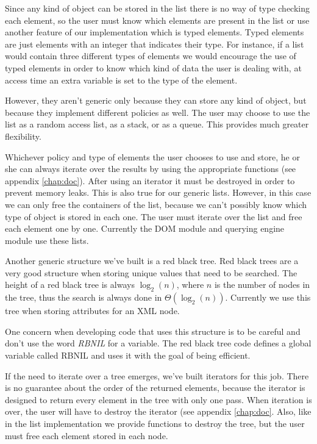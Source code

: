 \documentclass[a4paper]{report}
\begin{document}
		Since any kind of object can be stored in the list there is no way of type checking each element, so the user must know which elements are present in the list or use another feature of our implementation which is typed elements. Typed elements are just elements with an integer that indicates their type. For instance, if a list would contain three different types of elements we would encourage the use of typed elements in order to know which kind of data the user is dealing with, at access time an extra variable is set to the type of the element.

		However, they aren't generic only because they can store any kind of object, but because they implement different policies as well. The user may choose to use the list as a random access list, as a stack, or as a queue. This provides much greater flexibility.

		Whichever policy and type of elements the user chooses to use and store, he or she can always iterate over the results by using the appropriate functions (see appendix \ref{chap:doc}). After using an iterator it must be destroyed in order to prevent memory leaks. This is also true for our generic lists. However, in this case we can only free the containers of the list, because we can't possibly know which type of object is stored in each one. The user must iterate over the list and free each element one by one. Currently the DOM module and querying engine module use these lists.

		Another generic structure we've built is a red black tree. Red black trees are a very good structure when storing unique values that need to be searched. The height of a red black tree is always $\log_2(n)$, where $n$ is the number of nodes in the tree, thus the search is always done in $\Theta(\log_2(n))$. Currently we use this tree when storing attributes for an XML node.

		One concern when developing code that uses this structure is to be careful and don't use the word \emph{RBNIL} for a variable. The red black tree code defines a global variable called RBNIL and uses it with the goal of being efficient.

		If the need to iterate over a tree emerges, we've built iterators for this job. There is no guarantee about the order of the returned elements, because the iterator is designed to return every element in the tree with only one pass. When iteration is over, the user will have to destroy the iterator (see appendix \ref{chap:doc}. Also, like in the list implementation we provide functions to destroy the tree, but the user must free each element stored in each node.
\end{document}
